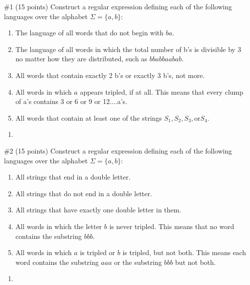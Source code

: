 \begin{problem}{\#1 (15 points)}
    Construct a regular expression defining each of the following languages over the alphabet \(\Sigma=\{a,b\}\):
    \begin{enumerate}[label=\alph*)]
        \item The language of all words that do not begin with \(ba\).
        \item The  language  of  all  words  in  which  the  total number of b’s is divisible by 3 no matter how they are distributed, such as \(bbabbaabab\).
        \item All words that contain exactly 2 b’s or exactly 3 b’s, not more.
        \item All words in which \(a\) appears tripled, if at all. This means that  every  clump of a’s contains 3 or 6 or 9 or 12....a’s.
        \item All words that contain at least one of the strings \(S_1,S_2,S_3, \text{or} S_4\).
    \end{enumerate}
\end{problem}
\vspace{2em}
\begin{solution}
    \begin{enumerate}[label=\alph*)]
        \item 
    \end{enumerate}
\end{solution}

\begin{problem}{\#2 (15 points)}
    Construct   a   regular   expression   defining   each   of   the following languages over the alphabet \(\Sigma=\{a,b\}\):
    \begin{enumerate}[label=\alph*)]
        \item All strings that end in a double letter.
        \item All strings that do not end in a double letter.
        \item All strings that have exactly one double letter in them.
        \item All words in which the letter \(b\) is never tripled. This means that no word contains the substring \(bbb\).
        \item All words in which \(a\) is tripled or \(b\) is tripled, but not both. This means each word contains the substring \(aaa\) or the substring \(bbb\) but not both.
    \end{enumerate}
\end{problem}
\vspace{2em}
\begin{solution}
    \begin{enumerate}[label=\alph*)]
        \item 
    \end{enumerate}
\end{solution}

